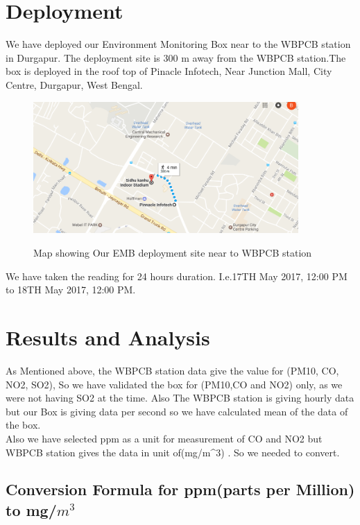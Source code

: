 \section{Deployment}

We have deployed our Environment Monitoring Box near to the WBPCB station in Durgapur. The deployment site is 300 m away from the WBPCB station.The box is deployed in the roof top of Pinacle Infotech, Near Junction Mall, City Centre, Durgapur, West Bengal.

\vspace{0.2in}

\begin{figure}[!htbp]
	\centering
	\includegraphics[width=0.9\textwidth]{deployment.png}
	\label{fig:Map showing Our EMB deployment site near to WBPCB station}
	\caption{Map showing Our EMB deployment site near to WBPCB station}
\end{figure}

\vspace{0.1in}
We have taken the reading for 24 hours duration. I.e.17TH May 2017, 12:00 PM to 18TH May 2017, 12:00 PM.

\section{Results and Analysis}
As Mentioned above, the WBPCB station data give the value for (PM10, CO, NO2, SO2), So we have validated the box for (PM10,CO and NO2) only, as we were not having SO2 at the time.
Also The WBPCB station is giving hourly data but our Box is giving data per second so we have calculated mean of the data of the box.
\\
Also we have selected ppm as a unit for measurement of CO and NO2 but WBPCB station gives the data in unit of(mg/m\textasciicircum3) . So we needed to convert.

\subsection{Conversion Formula for ppm(parts per Million) to mg/$m^3$}

